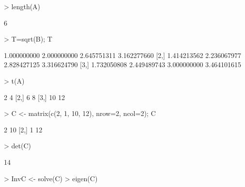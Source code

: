 \documentclass{article}
\begin{document}
\begin{Schunk}
\begin{Soutput}
\end{Soutput}
\begin{Sinput}
> length(A)
\end{Sinput}
\begin{Soutput}
[1] 6
\end{Soutput}
\begin{Sinput}
> T=sqrt(B); T
\end{Sinput}
\begin{Soutput}
            [,1]        [,2]        [,3]        [,4]
[1,] 1.000000000 2.000000000 2.645751311 3.162277660
[2,] 1.414213562 2.236067977 2.828427125 3.316624790
[3,] 1.732050808 2.449489743 3.000000000 3.464101615
\end{Soutput}
\begin{Sinput}
> t(A)
\end{Sinput}
\begin{Soutput}
     [,1] [,2]
[1,]    2    4
[2,]    6    8
[3,]   10   12
\end{Soutput}
\begin{Sinput}
> C <- matrix(c(2, 1, 10, 12), nrow=2, ncol=2); C
\end{Sinput}
\begin{Soutput}
     [,1] [,2]
[1,]    2   10
[2,]    1   12
\end{Soutput}
\begin{Sinput}
> det(C)
\end{Sinput}
\begin{Soutput}
[1] 14
\end{Soutput}
\begin{Sinput}
> InvC <- solve(C)
> eigen(C)
\end{Sinput}
\end{Schunk}
\end{document}
